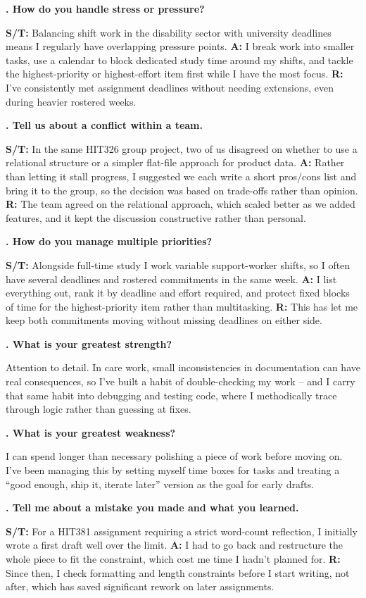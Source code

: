 \documentclass[10.5pt]{article}
\newcounter{qnum}
\newcommand{\qa}[2]{%
  \stepcounter{qnum}%
  \textbf{\theqnum. #1}\par
  #2\par
  \vspace{6pt}
}
\begin{document}
\qa{How do you handle stress or pressure?}{\textbf{S/T:} Balancing shift work in the disability sector with university deadlines means I regularly have overlapping pressure points. \textbf{A:} I break work into smaller tasks, use a calendar to block dedicated study time around my shifts, and tackle the highest-priority or highest-effort item first while I have the most focus. \textbf{R:} I've consistently met assignment deadlines without needing extensions, even during heavier rostered weeks.}

\qa{Tell us about a conflict within a team.}{\textbf{S/T:} In the same HIT326 group project, two of us disagreed on whether to use a relational structure or a simpler flat-file approach for product data. \textbf{A:} Rather than letting it stall progress, I suggested we each write a short pros/cons list and bring it to the group, so the decision was based on trade-offs rather than opinion. \textbf{R:} The team agreed on the relational approach, which scaled better as we added features, and it kept the discussion constructive rather than personal.}

\qa{How do you manage multiple priorities?}{\textbf{S/T:} Alongside full-time study I work variable support-worker shifts, so I often have several deadlines and rostered commitments in the same week. \textbf{A:} I list everything out, rank it by deadline and effort required, and protect fixed blocks of time for the highest-priority item rather than multitasking. \textbf{R:} This has let me keep both commitments moving without missing deadlines on either side.}

\qa{What is your greatest strength?}{Attention to detail. In care work, small inconsistencies in documentation can have real consequences, so I've built a habit of double-checking my work -- and I carry that same habit into debugging and testing code, where I methodically trace through logic rather than guessing at fixes.}

\qa{What is your greatest weakness?}{I can spend longer than necessary polishing a piece of work before moving on. I've been managing this by setting myself time boxes for tasks and treating a ``good enough, ship it, iterate later'' version as the goal for early drafts.}

\qa{Tell me about a mistake you made and what you learned.}{\textbf{S/T:} For a HIT381 assignment requiring a strict word-count reflection, I initially wrote a first draft well over the limit. \textbf{A:} I had to go back and restructure the whole piece to fit the constraint, which cost me time I hadn't planned for. \textbf{R:} Since then, I check formatting and length constraints before I start writing, not after, which has saved significant rework on later assignments.}
\end{document}
